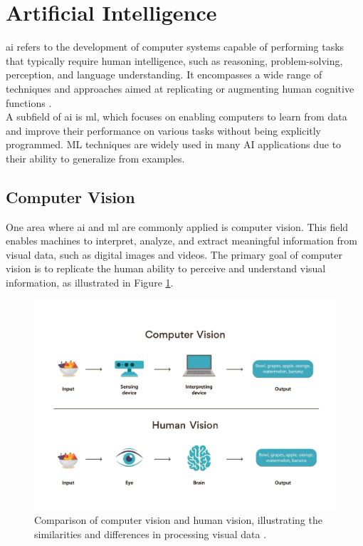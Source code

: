 \section{Artificial Intelligence} 
\label{sec:artificial-intelligence}

\gls{ai} refers to the development of computer systems capable of performing tasks that typically require human intelligence, such as reasoning, problem-solving, perception, and language understanding. It encompasses a wide range of techniques and approaches aimed at replicating or augmenting human cognitive functions \cite{ibm:ai}. \\

A subfield of \gls{ai} is \gls{ml}, which focuses on enabling computers to learn from data and improve their performance on various tasks without being explicitly programmed. ML techniques are widely used in many AI applications due to their ability to generalize from examples. \\

\subsection{Computer Vision}

One area where \gls{ai} and \gls{ml} are commonly applied is computer vision. This field enables machines to interpret, analyze, and extract meaningful information from visual data, such as digital images and videos. The primary goal of computer vision is to replicate the human ability to perceive and understand visual information, as illustrated in Figure \ref{fig:computer-vision}.

\begin{figure}[h!] \centering \includegraphics[width=0.75\linewidth]{figures/theory/machine-learning/computer-vision.png} \caption[Computer vision vs. human vision]{Comparison of computer vision and human vision, illustrating the similarities and differences in processing visual data \cite{turing:computer-vision}.} \label{fig:computer-vision} \end{figure}

